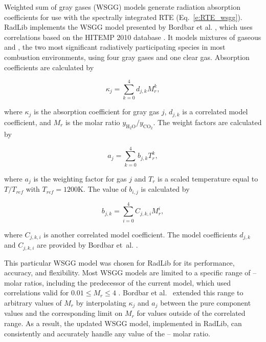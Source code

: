 \documentclass[preprint,12pt]{elsarticle}
\begin{document}
Weighted sum of gray gases (WSGG) models generate radiation absorption coefficients for use with the spectrally integrated RTE (Eq.~\ref{e:RTE_wsgg}).
RadLib implements the WSGG model presented by Bordbar et al. \citep{Bordbar_2014,Bordbar_2020}, which uses correlations based on the HITEMP 2010 database \cite{Rothman_2010}. It models mixtures of gaseous  and , the two most significant radiatively participating species in most combustion environments, using four gray gases and one clear gas. Absorption coefficients are calculated by 
%
\begin{linenomath}
\begin{equation}
    \kappa_j=\sum_{k=0}^{4}d_{j,k}M_r^k,
\end{equation}
\end{linenomath}
%
where $\kappa_j$ is the absorption coefficient for gray gas $j$, $d_{j,k}$ is a correlated model coefficient, and $M_r$ is the molar ratio $y_{\mathrm{H_2O}}/y_{\mathrm{CO_2}}$. The weight factors are calculated by 
%
\begin{linenomath}
\begin{equation}
    a_j=\sum_{k=0}^{4}b_{j,k}T_r^k,
\end{equation}
\end{linenomath}
%
where $a_j$ is the weighting factor for gas $j$ and $T_r$ is a scaled temperature equal to $T/T_{ref}$ with $T_{ref}=1200$K. The value of $b_{i,j}$ is calculated by 
%
\begin{linenomath}
\begin{equation}
 b_{j,k}=\sum_{i=0}^{4}C_{j,k,i}M_r^i,
\end{equation}
\end{linenomath}
%
where $C_{j,k,i}$ is another correlated model coefficient. The model coefficients $d_{j,k}$ and $C_{j,k,i}$ are provided by Bordbar et~al. \citep{Bordbar_2014,Bordbar_2020}. 

This particular WSGG model was chosen for RadLib for its performance, accuracy, and flexibility. Most WSGG models are limited to a specific range of -- molar ratios, including the predecessor of the current model, which used correlations valid for $0.01\le M_r\le4$ \citep{Bordbar_2014}. Bordbar et al.~\citep{Bordbar_2020} extended this range to arbitrary values of $M_r$ by interpolating $\kappa_j$ and $a_j$ between the pure component values and the corresponding limit on $M_r$ for values outside of the correlated range. As a result, the updated WSGG model, implemented in RadLib, can consistently and accurately handle any value of the -- molar ratio. 
\end{document}
